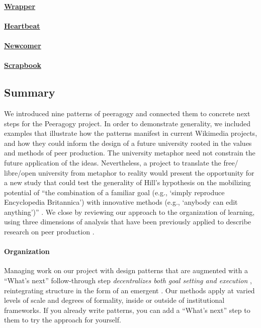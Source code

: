 \begin{refsection}
\paragraph{\hyperref[sec:Wrapper]{Wrapper}}
\WrapperWN

\paragraph{\hyperref[sec:Heartbeat]{Heartbeat}}
\HeartbeatWN

\paragraph{\hyperref[sec:Newcomer]{Newcomer}}
\NewcomerWN

\paragraph{\hyperref[sec:Scrapbook]{Scrapbook}} 
\ScrapbookWN

\subsection*{Summary}

We introduced nine patterns of peeragogy and connected them to
concrete next steps for the Peeragogy project.  In order to
demonstrate generality, we included examples that illustrate how the
patterns manifest in current Wikimedia projects, and how they could
inform the design of a future university rooted in the values and
methods of peer production.
%
The university metaphor need not constrain the future application of
the ideas.  Nevertheless, a project to translate the free\slash
libre\slash open university from metaphor to reality would present the
opportunity for a new study that could test the generality of Hill's
hypothesis on the mobilizing potential of ``the combination of a
familiar goal (e.g., `simply reproduce Encyclopedia Britannica') with
innovative methods (e.g., `anybody can edit anything')''
\cite[p.~13]{mako-thesis}.
We close by reviewing our approach to the organization of learning,
using three dimensions of analysis that have been previously applied to describe
research on peer production \cite{benkler2015peer}.

\paragraph{Organization} 
Managing work on our project with design patterns that are augmented
with a ``What's next'' follow-through step \emph{decentralizes both
  goal setting and execution} \cite{benkler2015peer}, reintegrating
structure in the form of an emergent .  Our
methods apply at varied levels of scale and degrees of formality,
inside or outside of institutional frameworks.  If you already write
patterns, you can add a ``What's next'' step to them to try the
approach for yourself.


\end{refsection}
